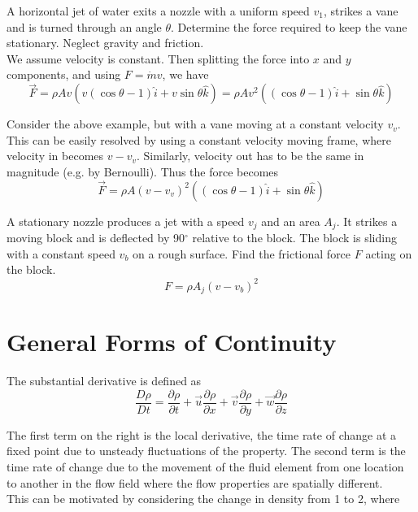 \documentclass[12pt]{article}
\begin{document}
\begin{ex}
	A horizontal jet of water exits a nozzle with a uniform speed $v_1$, strikes a vane and is turned through an angle $\theta$. Determine the force required to keep the vane stationary. Neglect gravity and friction. \\
	We assume velocity is constant. Then splitting the force into $x$ and $y$ components, and using $F = \dot{m}v$, we have
	$$\vec{F} = \rho Av(v(\cos\theta-1)\hat{i} + v\sin\theta\hat{k}) = \rho Av^2((\cos\theta-1)\hat{i} + \sin\theta\hat{k})$$
\end{ex}

\begin{ex}
	Consider the above example, but with a vane moving at a constant velocity $v_v$. \\
	This can be easily resolved by using a constant velocity moving frame, where velocity in becomes $v-v_v$. Similarly, velocity out has to be the same in magnitude (e.g. by Bernoulli). Thus the force becomes
	$$\vec{F} = \rho A(v-v_v)^2((\cos\theta-1)\hat{i} + \sin\theta\hat{k})$$
\end{ex}

\begin{ex}
	A stationary nozzle produces a jet with a speed $v_j$ and an area $A_j$. It strikes a moving block and is deflected by 90$^\circ$ relative to the block. The block is sliding with a constant speed $v_b$ on a rough surface. Find the frictional force $F$ acting on the block.
	$$F = \rho A_j(v-v_b)^2$$
\end{ex}

\section{General Forms of Continuity}

\begin{defn}
	The substantial derivative is defined as
	$$\frac{D\rho}{Dt} = \frac{\partial\rho}{\partial t} + \vec{u}\frac{\partial\rho}{\partial x} + \vec{v}\frac{\partial\rho}{\partial y} + \vec{w}\frac{\partial\rho}{\partial z}$$
\end{defn}

The first term on the right is the local derivative, the time rate of change at a fixed point due to unsteady fluctuations of the property. The second term is the time rate of change due to the movement of the fluid element from one location to another in the flow field where the flow properties are spatially different. \\
This can be motivated by considering the change in density from 1 to 2, where
\end{document}
